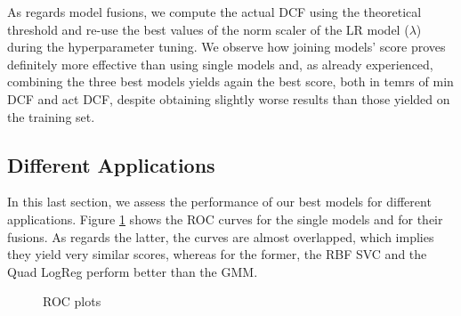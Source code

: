 As regards model fusions, we compute the actual DCF using the theoretical threshold and re-use the best values of the norm scaler of the LR model ($\lambda$) during the hyperparameter tuning. We observe how joining models' score proves definitely more effective than using single models and, as already experienced, combining the three best models yields again the best score, both in temrs of min DCF and act DCF, despite obtaining slightly worse results than those yielded on the training set.


\subsection{Different Applications}

In this last section, we assess the performance of our best models for different applications. Figure \ref{fig:roc} shows the ROC curves for the single models and for their fusions. As regards the latter, the curves are almost overlapped, which implies they yield very similar scores, whereas for the former, the RBF SVC and the Quad LogReg perform better than the GMM. 


\begin{figure}[H]
	\caption{ROC plots}
	\label{fig:roc}
\end{figure}


